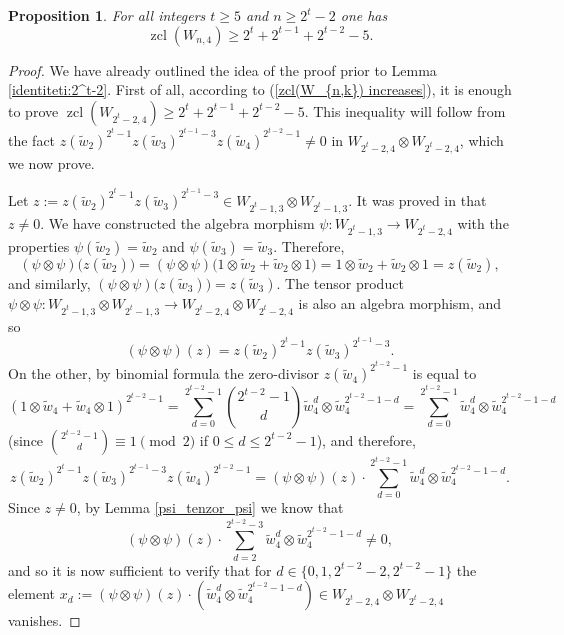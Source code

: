 \documentclass{amsart}
\newtheorem{proposition}[theorem]{Proposition}
\theoremstyle{definition}
\theoremstyle{remark}
\numberwithin{equation}{section}
\newcommand{\w}{\widetilde w}
\newcommand{\zcl}{\operatorname{zcl}}
\newcommand{\arr}{\rightarrow}
\renewcommand{\le}{\leqslant}
\renewcommand{\ge}{\geqslant}
\begin{document}
\begin{proposition}\label{zcl:dostizanje 2^t-2}
    For all integers $t\ge5$ and $n\ge2^t-2$ one has 
    \[\zcl(W_{n,4})\ge2^t+2^{t-1}+2^{t-2}-5.\]
\end{proposition}
\begin{proof}
    We have already outlined the idea of the proof prior to Lemma \ref{identiteti:2^t-2}. First of all, according to (\ref{zcl(W_{n,k}) increases}), it is enough to prove $\zcl(W_{2^t-2,4})\ge2^t+2^{t-1}+2^{t-2}-5$. This inequality will follow from the fact $z(\w_2)^{2^t-1}z(\w_3)^{2^{t-1}-3}z(\w_4)^{2^{t-2}-1}\ne0$ in $W_{2^t-2,4}\otimes W_{2^t-2,4}$, which we now prove.

    \medskip

    Let $z:=z(\w_2)^{2^t-1}z(\w_3)^{2^{t-1}-3}\in W_{2^t-1,3}\otimes W_{2^t-1,3}$. It was proved in \cite[Proposition 3.9 and Lemma 3.4]{CPR} that $z\ne0$. We have constructed the algebra morphism $\psi:W_{2^t-1,3}\arr W_{2^t-2,4}$ with the properties $\psi(\w_2)=\w_2$ and $\psi(\w_3)=\w_3$. Therefore,
    \[(\psi\otimes\psi)\big(z(\w_2)\big)=(\psi\otimes\psi)\big(1\otimes\w_2+\w_2\otimes1\big)=1\otimes\w_2+\w_2\otimes1=z(\w_2),\]
    and similarly, $(\psi\otimes\psi)\big(z(\w_3)\big)=z(\w_3)$. The tensor product $\psi\otimes\psi:W_{2^t-1,3}\otimes W_{2^t-1,3}\arr W_{2^t-2,4}\otimes W_{2^t-2,4}$ is also an algebra morphism, and so
    \begin{equation}\label{(psi_tenzor_psi)(z)}
    (\psi\otimes\psi)(z)=z(\w_2)^{2^t-1}z(\w_3)^{2^{t-1}-3}.
    \end{equation}
On the other, by binomial formula the zero-divisor $z(\w_4)^{2^{t-2}-1}$ is equal to
\[(1\otimes\w_4+\w_4\otimes1)^{2^{t-2}-1}=\sum_{d=0}^{2^{t-2}-1}\binom{2^{t-2}-1}{ d}\w_4^d\otimes\w_4^{2^{t-2}-1-d}=\sum_{d=0}^{2^{t-2}-1}\w_4^d\otimes\w_4^{2^{t-2}-1-d}\]
(since $\binom{2^{t-2}-1}{d}\equiv1\pmod2$ if $0\le d\le2^{t-2}-1$), and therefore,
\[
   z(\w_2)^{2^t-1}z(\w_3)^{2^{t-1}-3}z(\w_4)^{2^{t-2}-1}=(\psi\otimes\psi)(z)\cdot\sum_{d=0}^{2^{t-2}-1}\w_4^d\otimes\w_4^{2^{t-2}-1-d}.
\]
Since $z\ne0$, by Lemma \ref{psi_tenzor_psi} we know that 
\[(\psi\otimes\psi)(z)\cdot\sum_{d=2}^{2^{t-2}-3}\w_4^d\otimes\w_4^{2^{t-2}-1-d}\ne0,\] and so it is now sufficient to verify that for $d\in\{0,1,2^{t-2}-2,2^{t-2}-1\}$ the element $x_d:=(\psi\otimes\psi)(z)\cdot(\w_4^d\otimes\w_4^{2^{t-2}-1-d})\in W_{2^t-2,4}\otimes W_{2^t-2,4}$ vanishes. 


\end{proof}
\end{document}
